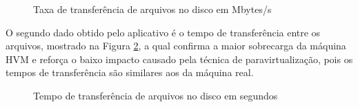 \documentclass[times, 10pt,twocolumn]{article}
\begin{document}
\begin{figure}[!htb]
\centering
{}
\caption{Taxa de transferência de arquivos no disco em Mbytes/s}
\label{fig:disco_t}
\end{figure}

O segundo dado obtido pelo aplicativo é o tempo de transferência entre os arquivos,
mostrado na Figura \ref{fig:disco_tmp}, a qual confirma a maior sobrecarga
da máquina HVM e reforça o baixo impacto causado pela técnica de paravirtualização,
pois os tempos de transferência são similares aos da máquina real.

\begin{figure}[!htb]
\centering 
{}
\caption{Tempo de transferência de arquivos no disco em segundos}
\label{fig:disco_tmp}
\end{figure}
\end{document}
